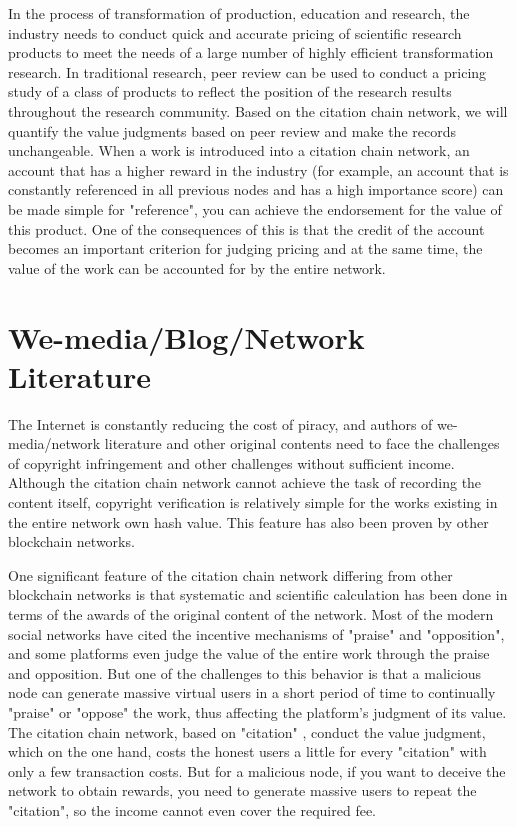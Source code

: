 \documentclass[a4paper,oneside,openany]{tufte-book}
\begin{document}
In the process of transformation of production, education and research, the industry needs to conduct quick and accurate pricing of scientific research products to meet the needs of a large number of highly efficient transformation research. In traditional research, peer review can be used to conduct a pricing study of a class of products to reflect the position of the research results throughout the research community. Based on the citation chain network, we will quantify the value judgments based on peer review and make the records unchangeable. When a work is introduced into a citation chain network, an account that has a higher reward in the industry (for example, an account that is constantly referenced in all previous nodes and has a high importance score) can be made simple for "reference", you can achieve the endorsement for the value of this product. One of the consequences of this is that the credit of the account becomes an important criterion for judging pricing and at the same time, the value of the work can be accounted for by the entire network.


\section{We-media/Blog/Network Literature}
The Internet is constantly reducing the cost of piracy, and authors of we-media/network literature and other original contents need to face the challenges of copyright infringement and other challenges without sufficient income. Although the citation chain network cannot achieve the task of recording the content itself, copyright verification is relatively simple for the works existing in the entire network own  hash value. This feature has also been proven by other blockchain networks.




One significant feature of the citation chain network differing from other blockchain networks is that systematic and scientific calculation has been done in terms of the awards of the original content of the network. Most of the modern social networks have cited the incentive mechanisms of "praise" and "opposition", and some platforms even judge the value of the entire work through the praise and opposition. But one of the challenges to this behavior is that a malicious node can generate massive virtual users in a short period of time to continually "praise" or "oppose" the work, thus affecting the platform's judgment of its value. The citation chain network, based on "citation" , conduct the value judgment, which on the one hand, costs the honest users a little for every "citation" with only a few transaction costs. But for a malicious node, if you want to deceive the network to obtain rewards, you need to generate massive users to repeat the "citation", so the income cannot even cover the required fee.
\end{document}
